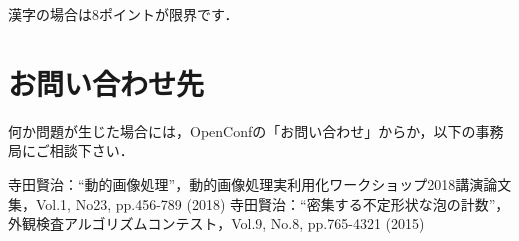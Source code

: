 \documentclass[a4j,twocolumn,10pt]{jarticle}
\begin{document}
漢字の場合は8ポイントが限界です．


\section{お問い合わせ先}

何か問題が生じた場合には，OpenConfの「お問い合わせ」からか，以下の事務局にご相談下さい．

\hspace{-5mm}

\begin{thebibliography}{9}
 寺田賢治：“動的画像処理”，動的画像処理実利用化ワークショップ2018講演論文集，Vol.1, No23, pp.456-789 (2018)
 寺田賢治：“密集する不定形状な泡の計数”，外観検査アルゴリズムコンテスト，Vol.9, No.8, pp.765-4321 (2015)
\end{thebibliography}
\end{document}
